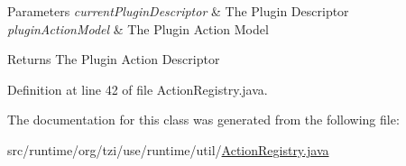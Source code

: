 \begin{DoxyParams}{Parameters}
{\em current\-Plugin\-Descriptor} & The Plugin Descriptor \\
\hline
{\em plugin\-Action\-Model} & The Plugin Action Model \\
\hline
\end{DoxyParams}
\begin{DoxyReturn}{Returns}
The Plugin Action Descriptor 
\end{DoxyReturn}


Definition at line 42 of file Action\-Registry.\-java.



The documentation for this class was generated from the following file\-:\begin{DoxyCompactItemize}
\item 
src/runtime/org/tzi/use/runtime/util/\hyperlink{_action_registry_8java}{Action\-Registry.\-java}\end{DoxyCompactItemize}
